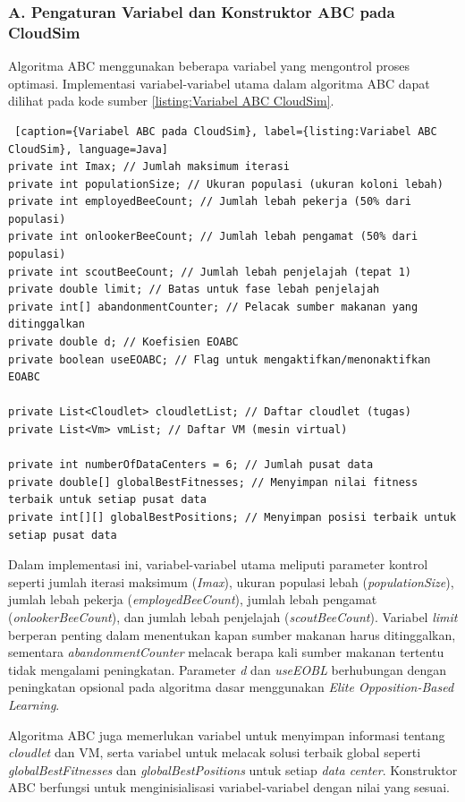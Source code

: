 \subsubsection{A. Pengaturan Variabel dan Konstruktor ABC pada CloudSim}
Algoritma ABC menggunakan beberapa variabel yang mengontrol proses optimasi. Implementasi variabel-variabel utama dalam algoritma ABC dapat dilihat pada kode sumber \ref{listing:Variabel ABC CloudSim}.

\begin{lstlisting} [caption={Variabel ABC pada CloudSim}, label={listing:Variabel ABC CloudSim}, language=Java]
private int Imax; // Jumlah maksimum iterasi
private int populationSize; // Ukuran populasi (ukuran koloni lebah)
private int employedBeeCount; // Jumlah lebah pekerja (50% dari populasi)
private int onlookerBeeCount; // Jumlah lebah pengamat (50% dari populasi)
private int scoutBeeCount; // Jumlah lebah penjelajah (tepat 1)
private double limit; // Batas untuk fase lebah penjelajah
private int[] abandonmentCounter; // Pelacak sumber makanan yang ditinggalkan
private double d; // Koefisien EOABC
private boolean useEOABC; // Flag untuk mengaktifkan/menonaktifkan EOABC

private List<Cloudlet> cloudletList; // Daftar cloudlet (tugas)
private List<Vm> vmList; // Daftar VM (mesin virtual)

private int numberOfDataCenters = 6; // Jumlah pusat data
private double[] globalBestFitnesses; // Menyimpan nilai fitness terbaik untuk setiap pusat data
private int[][] globalBestPositions; // Menyimpan posisi terbaik untuk setiap pusat data
\end{lstlisting}

Dalam implementasi ini, variabel-variabel utama meliputi parameter kontrol seperti jumlah iterasi maksimum (\textit{Imax}), ukuran populasi lebah (\textit{populationSize}), jumlah lebah pekerja (\textit{employedBeeCount}), jumlah lebah pengamat (\textit{onlookerBeeCount}), dan jumlah lebah penjelajah (\textit{scoutBeeCount}). Variabel \textit{limit} berperan penting dalam menentukan kapan sumber makanan harus ditinggalkan, sementara \textit{abandonmentCounter} melacak berapa kali sumber makanan tertentu tidak mengalami peningkatan. Parameter \textit{d} dan \textit{useEOBL} berhubungan dengan peningkatan opsional pada algoritma dasar menggunakan \textit{Elite Opposition-Based Learning}.

Algoritma ABC juga memerlukan variabel untuk menyimpan informasi tentang \textit{cloudlet} dan VM, serta variabel untuk melacak solusi terbaik global seperti \textit{globalBestFitnesses} dan \textit{globalBestPositions} untuk setiap \textit{data center}. Konstruktor ABC berfungsi untuk menginisialisasi variabel-variabel dengan nilai yang sesuai.

